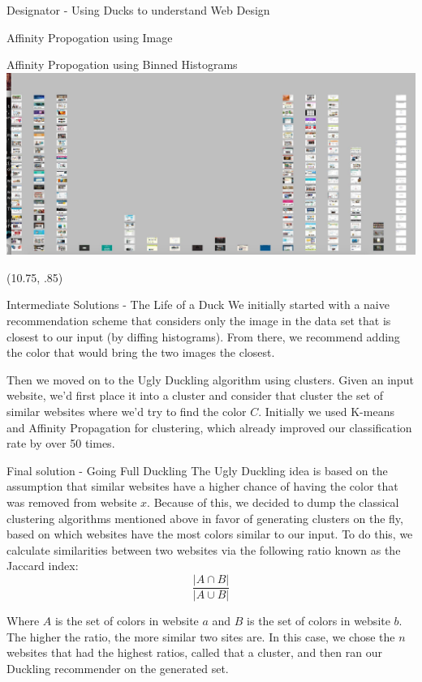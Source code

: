 \documentclass{beamer}
\begin{document}
\begin{frame}{\centerline{\Huge Designator - Using Ducks to understand Web Design}}
\begin{textblock}{5}
\begin{block}{Affinity Propogation using Image}
\end{block}
\begin{block}{Affinity Propogation using Binned Histograms}
\includegraphics[scale=.5]{binAffProp.jpg}
\end{block}
\end{textblock}

\begin{textblock}{5}(10.75, .85)
\begin{block}{Intermediate Solutions - The Life of a Duck}
We initially started with a naive recommendation scheme that considers only the image in the data set that is closest to our input (by diffing
histograms). From there, we recommend adding the color that would bring the two images the
closest.

Then we moved on to the Ugly Duckling algorithm using clusters. Given an input website, we'd first place it into a
cluster and consider that cluster the set of similar websites where we'd try to find the color $C$. Initially we used K-means and
Affinity Propagation for clustering, which already improved our classification rate by over 50 times.
\end{block}

\begin{block}{Final solution - Going Full Duckling}
The Ugly Duckling idea is based on the assumption that similar websites have a higher chance of having the color that
was removed from website $x$. Because of this, we decided to dump the classical clustering algorithms mentioned above in favor of
generating clusters on the fly, based on which websites have the most colors similar to our input. To do this, we
calculate similarities between two websites via the following ratio known as the Jaccard index:
$$\frac{|A \cap B|}{|A \cup B|}$$

Where $A$ is the set of colors in website $a$ and $B$ is the set of colors in website $b$. The higher the ratio, the
more similar two sites are. In this case, we chose the $n$ websites that had the highest ratios, called that a cluster,
and then ran our Duckling recommender on the generated set.


\end{block}
\end{textblock}
\end{frame}
\end{document}
